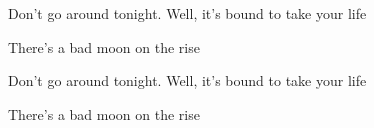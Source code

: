 \begin{song}
\bigskip

Don’t go around tonight. Well, it’s bound to take your life \par
{}There’s a bad moon on the rise \par

\bigskip

Don’t go around tonight. Well, it’s bound to take your life \par
{}There’s a bad moon on the rise  \par

\end{song}
